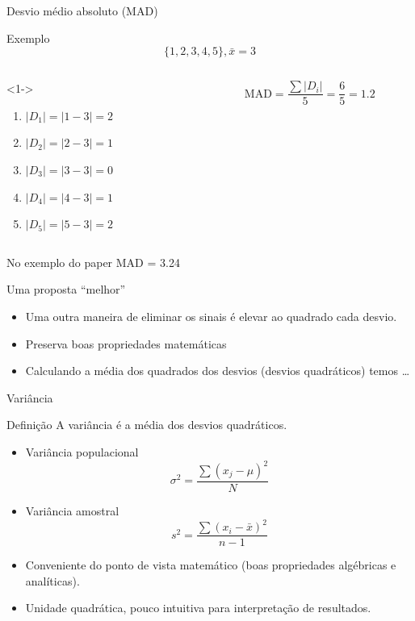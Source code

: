 \documentclass{beamer}
\begin{document}
\begin{frame}{\scriptsize Desvio médio absoluto (MAD)}
  \begin{exampleblock}{Exemplo}
    \footnotesize
  \begin{displaymath}
    \{1,2,3,4,5\}, \bar{x} = 3
  \end{displaymath}
  \begin{columns}
    \begin{column}{5cm}<1->
      \begin{enumerate}
        \footnotesize
      \item $|D_1| = |1-3| = 2$
      \item $|D_2| = |2-3| = 1$
      \item $|D_3| = |3-3| = 0$
      \item $|D_4| = |4-3| = 1$
      \item $|D_5| = |5-3| = 2$
      \end{enumerate}
    \end{column}
    \begin{column}{5cm}
      \begin{displaymath}
        \mathrm{MAD } = \frac{\sum |D_i|}{5} = \frac{6}{5} = 1.2
      \end{displaymath}
    \end{column}
  \end{columns}
\end{exampleblock}
\begin{block}{No exemplo do paper}
    \footnotesize
  MAD = 3.24
\end{block}
\end{frame}

\begin{frame}{\scriptsize Uma proposta ``melhor''}
  \begin{itemize}
    \footnotesize
  \item Uma outra maneira de eliminar os sinais é elevar ao quadrado
    cada desvio.
  \item Preserva boas propriedades matemáticas
  \item Calculando a média dos quadrados dos desvios (desvios
    quadráticos) temos \ldots
  \end{itemize}
\end{frame}

\begin{frame}{\scriptsize Variância}
  \begin{block}{Definição}
    A variância é a média dos desvios quadráticos.
  \end{block}
  \begin{itemize}
    \footnotesize
  \item Variância populacional
$$\sigma^2 = \frac{\sum (x_j - \mu)^2}{N}$$
\item Variância amostral
$$s^2 = \frac{\sum (x_i - \bar{x})^2}{n-1}$$
\item Conveniente do ponto de vista matemático (boas propriedades
  algébricas e analíticas).
\item Unidade quadrática, pouco intuitiva para interpretação de
  resultados.
  \end{itemize}
\end{frame}
\end{document}
